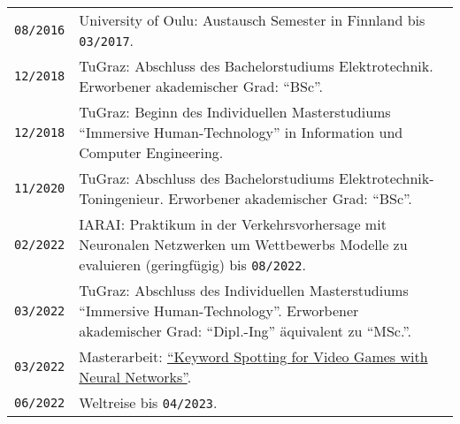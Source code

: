 {\begin{tabularx}{\columnwidth}{>{\centering\arraybackslash}p{1.5cm} | p{12cm}}
  \texttt{08/2016} & University of Oulu: Austausch Semester in Finnland bis \texttt{03/2017}.\\
  \texttt{12/2018} & TuGraz: Abschluss des Bachelorstudiums Elektrotechnik. Erworbener akademischer Grad: \enquote{BSc}.\\
  \texttt{12/2018} & TuGraz: Beginn des Individuellen Masterstudiums \enquote{Immersive Human-Technology} in Information und Computer Engineering.\\
  \texttt{11/2020} & TuGraz: Abschluss des Bachelorstudiums Elektrotechnik-Toningenieur. Erworbener akademischer Grad: \enquote{BSc}.\\
  \texttt{02/2022} & IARAI: Praktikum in der Verkehrsvorhersage mit Neuronalen Netzwerken um Wettbewerbs Modelle zu evaluieren (geringfügig) bis \texttt{08/2022}.\\
  \texttt{03/2022} & TuGraz: Abschluss des Individuellen Masterstudiums \enquote{Immersive Human-Technology}. Erworbener akademischer Grad: \enquote{Dipl.-Ing} äquivalent zu \enquote{MSc.}.\\
  \texttt{03/2022} & Masterarbeit: \href{https://github.com/chrisworld/kws_game}{\enquote{Keyword Spotting for Video Games with Neural Networks}}.\\
  \texttt{06/2022} & Weltreise bis \texttt{04/2023}.\\
\end{tabularx}
}
